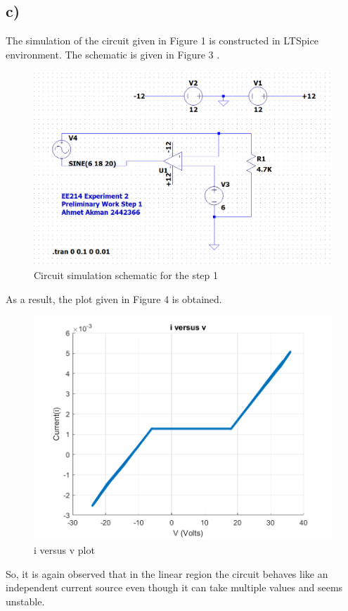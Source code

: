 \documentclass[letterpaper,12pt]{article}
\begin{document}
\subsection{c)}
The simulation of the circuit given in Figure 1 is constructed in LTSpice environment. The schematic is given in Figure 3 .
\begin{figure}[H]
    \centering
    \includegraphics[width=1\textwidth]{1sim.png}
\caption{Circuit simulation schematic  for the step 1}
\end{figure} 
As a result, the plot given in Figure 4 is obtained.
\begin{figure}[H]
    \centering
    \includegraphics[width=1\textwidth]{1.png}
\caption{i versus v plot} 
\end{figure} 
So, it is again observed that in the linear region the circuit behaves like an independent current source even though it can take multiple values and seems unstable.
\end{document}
